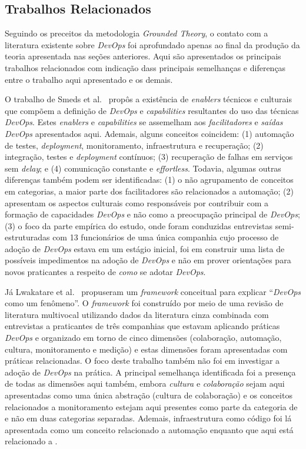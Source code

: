\subsection{Trabalhos Relacionados}

Seguindo os preceitos da metodologia {\it Grounded Theory}, o contato com a
literatura existente sobre {\it DevOps} foi aprofundado apenas ao final da
produção da teoria apresentada nas seções anteriores. Aqui são apresentados
os principais trabalhos relacionados com indicação dass principais semelhanças
e diferenças entre o trabalho aqui apresentado e os demais.

O trabalho de Smeds et al.~\cite{devops_a_definition} propôs a existência de
{\it enablers} técnicos e culturais que compõem a definição de {\it DevOps} e
{\it capabilities} resultantes do uso das técnicas {\it DevOps}. Estes
{\it enablers} e {\it capabilities} se assemelham aos \emph{facilitadores} e
\emph{saídas DevOps} apresentados aqui. Ademais, alguns conceitos coincidem:
(1) automação de testes, {\it deployment}, monitoramento, infraestrutura e
recuperação; (2) integração, testes e {\it deployment} contínuos; (3) recuperação
de falhas em serviços sem {\it delay}; e (4) comunicação constante e {\it effortless}.
Todavia, algumas outras diferenças também podem ser identificadas: (1) o não
agrupamento de conceitos em categorias, a maior parte dos facilitadores são
relacionados a automação; (2) apresentam os aspectos culturais como responsáveis
por contribuir com a formação de capacidades {\it DevOps} e não como a
preocupação principal de {\it DevOps}; (3) o foco da parte empírica do estudo,
onde foram conduzidas entrevistas semi-estruturadas com 13 funcionários de uma única
companhia cujo processo de adoção de {\it DevOps} estava em um estágio inicial,
foi em construir uma lista de possíveis impedimentos na adoção de {\it DevOps} e
não em prover orientações para novos praticantes a respeito de \emph{como} se
adotar {\it DevOps}.

Já Lwakatare et al.~\cite{dimensions_of_devops,extending_dimensions} propuseram
um {\it framework} conceitual para explicar ``{\it DevOps} como um fenômeno''.
O {\it framework} foi construído por meio de uma revisão de literatura multivocal
utilizando dados da literatura cinza combinada com entrevistas a praticantes de
três companhias que estavam aplicando práticas {\it DevOps} e organizado em
torno de cinco dimensões (colaboração, automação, cultura, monitoramento e
medição) e estas dimensões foram apresentadas com práticas relacionadas. O foco
deste trabalho também não foi em investigar a adoção de {\it DevOps} na prática.
A principal semelhança identificada foi a presença de todas as dimensões aqui
também, embora \emph{cultura} e \emph{colaboração} sejam aqui apresentadas como
uma única abstração (cultura de colaboração) e os conceitos relacionados a
monitoramento estejam aqui presentes como parte da categoria de  e não em duas categorias separadas. Ademais, infraestrutura como
código foi lá apresentada como um conceito relacionado a automação enquanto que
aqui está relacionado a .

